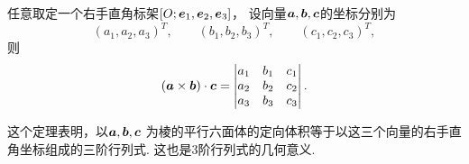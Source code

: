 \begin{theorem}\label{theorem:解析几何.在右手直角标架下计算混合积}
任意取定一个右手直角标架\([O;\boldsymbol{e}_1,\boldsymbol{e}_2,\boldsymbol{e}_3]\)，
设向量\(\boldsymbol{a},\boldsymbol{b},\boldsymbol{c}\)的坐标分别为\begin{equation*}
	(a_1,a_2,a_3)^T, \qquad
	(b_1,b_2,b_3)^T, \qquad
	(c_1,c_2,c_3)^T,
\end{equation*}
则\begin{equation}
	(\boldsymbol{a}\times\boldsymbol{b})\cdot\boldsymbol{c}
	= \begin{vmatrix}
		a_1 & b_1 & c_1 \\
		a_2 & b_2 & c_2 \\
		a_3 & b_3 & c_3
	\end{vmatrix}.
\end{equation}
\end{theorem}
这个定理表明，以\(\boldsymbol{a},\boldsymbol{b},\boldsymbol{c}\)
为棱的平行六面体的定向体积等于以这三个向量的右手直角坐标组成的三阶行列式.
这也是3阶行列式的几何意义.

